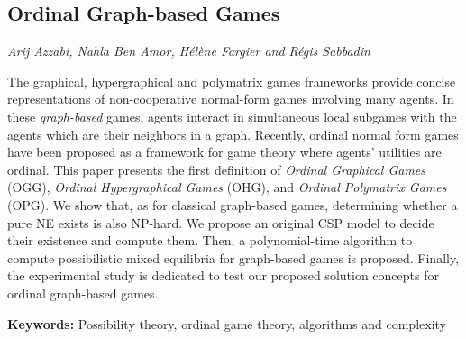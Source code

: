 \documentclass[../booklet.tex]{subfiles}
\begin{document}
\subsection[Ordinal Graph-based Games. {\it Arij Azzabi, Nahla Ben Amor, Hélène Fargier and Régis Sabbadin}]{ Ordinal Graph-based Games}
   

\begin{center}
  {\it Arij Azzabi, Nahla Ben Amor, Hélène Fargier and Régis Sabbadin}
\end{center}

\vskip 0.8cm

 
 The graphical, hypergraphical and polymatrix games frameworks provide concise representations of non-cooperative normal-form games involving many agents. In these {\em graph-based} games, agents interact in simultaneous local subgames with the agents which are their neighbors in a graph. 
Recently, ordinal normal form games have been proposed as a framework for game theory where agents' utilities are ordinal. 
This paper presents the first definition of \emph{Ordinal Graphical Games} (OGG),  \emph{Ordinal Hypergraphical Games} (OHG), and \emph{Ordinal Polymatrix Games} (OPG). 
We show that, as for classical graph-based games, determining whether a pure NE exists is also NP-hard. We propose an original CSP model to decide their existence and compute them.
Then, a polynomial-time algorithm to compute possibilistic mixed equilibria for graph-based games is proposed. Finally, the experimental study is dedicated to test our proposed solution concepts for ordinal graph-based games.

{\bf Keywords:} Possibility theory, ordinal game theory, algorithms and complexity 
\end{document}
